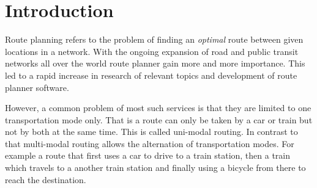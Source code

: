 \section{Introduction}\label{introduction}
	Route planning refers to the problem of finding an \textit{optimal} route between given locations in a network.
	With the ongoing expansion of road and public transit networks all over the world route planner gain more and
	more importance. This led to a rapid increase in research of relevant topics and development of route planner software.
	
	However, a common problem of most such services is that they are limited to one transportation mode only.
	That is a route can only be taken by a car or train but not by both at the same time. This is called uni-modal routing.
	In contrast to that multi-modal routing allows the alternation of transportation modes. For example a route that
	first uses a car to drive to a train station, then a train which travels to a another train station and finally
	using a bicycle from there to reach the destination.
	
